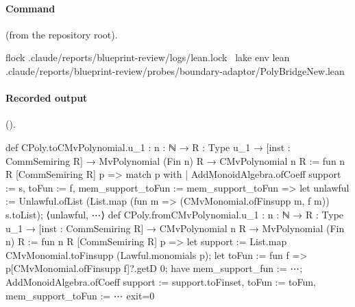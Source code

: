 \paragraph{Command} (from the repository root).
\begin{shellcode}
flock .claude/reports/blueprint-review/logs/lean.lock \
  lake env lean .claude/reports/blueprint-review/probes/boundary-adaptor/PolyBridgeNew.lean
\end{shellcode}

\paragraph{Recorded output} ().
\begin{srccode}[numbers=left,numbersep=3pt]
def CPoly.toCMvPolynomial.{u_1} : {n : ℕ} →
  {R : Type u_1} → [inst : CommSemiring R] → MvPolynomial (Fin n) R → CMvPolynomial n R :=
fun {n} {R} [CommSemiring R] p =>
  match p with
  | AddMonoidAlgebra.ofCoeff { support := s, toFun := f, mem_support_toFun := mem_support_toFun } =>
    let unlawful := Unlawful.ofList (List.map (fun m => (CMvMonomial.ofFinsupp m, f m)) s.toList);
    ⟨unlawful, ⋯⟩
def CPoly.fromCMvPolynomial.{u_1} : {n : ℕ} →
  {R : Type u_1} → [inst : CommSemiring R] → CMvPolynomial n R → MvPolynomial (Fin n) R :=
fun {n} {R} [CommSemiring R] p =>
  let support := List.map CMvMonomial.toFinsupp (Lawful.monomials p);
  let toFun := fun f => p[CMvMonomial.ofFinsupp f]?.getD 0;
  have mem_support_fun := ⋯;
  AddMonoidAlgebra.ofCoeff { support := support.toFinset, toFun := toFun, mem_support_toFun := ⋯ }
exit=0
\end{srccode}

